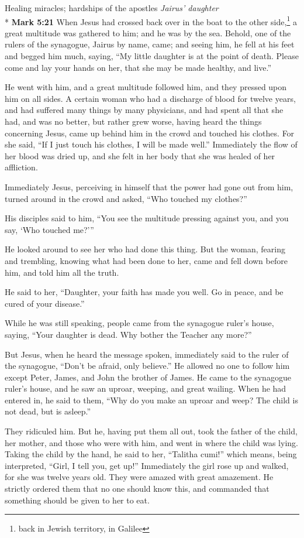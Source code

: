 \documentclass[10pt,a5paper,twoside]{article}
\newcommand{\quotesize}{\normalsize{}}
\newenvironment{quotetext}{\begingroup\quotesize}{\endgroup}
\newcommand{\intex}[1]{\index[texts]{#1}}
\newcommand{\bible}[2]{\begin{quotetext}\textbf{#1}\intex{#1} #2\end{quotetext}}
\newcommand{\gospelmark}[2]{\bible{Mark #1}{#2}}
\newcommand{\subhead}[1]{\emph{#1}\\*}
\begin{document}
\begin{section}{Healing miracles; hardships of the apostles}
\subhead{Jairus' daughter}
\gospelmark{5:21}{
  When Jesus had crossed back over in the boat to the other side,\footnote{back in Jewish territory, in Galilee} a great multitude was gathered to him; and he was by the sea.   Behold, one of the rulers of the synagogue, Jairus by name, came; and seeing him, he fell at his feet   and begged him much, saying, ``My little daughter is at the point of death. Please come and lay your hands on her, that she may be made healthy, and live.''

  He went with him, and a great multitude followed him, and they pressed upon him on all sides.   A certain woman who had a discharge of blood for twelve years,   and had suffered many things by many physicians, and had spent all that she had, and was no better, but rather grew worse,   having heard the things concerning Jesus, came up behind him in the crowd and touched his clothes.   For she said, ``If I just touch his clothes, I will be made well.''   Immediately the flow of her blood was dried up, and she felt in her body that she was healed of her affliction.

  Immediately Jesus, perceiving in himself that the power had gone out from him, turned around in the crowd and asked, ``Who touched my clothes?''

  His disciples said to him, ``You see the multitude pressing against you, and you say, `Who touched me?'{}''

  He looked around to see her who had done this thing.   But the woman, fearing and trembling, knowing what had been done to her, came and fell down before him, and told him all the truth.

  He said to her, ``Daughter, your faith has made you well. Go in peace, and be cured of your disease.''

  While he was still speaking, people came from the synagogue ruler's house, saying, ``Your daughter is dead. Why bother the Teacher any more?''

  But Jesus, when he heard the message spoken, immediately said to the ruler of the synagogue, ``Don't be afraid, only believe.''   He allowed no one to follow him except Peter, James, and John the brother of James.   He came to the synagogue ruler's house, and he saw an uproar, weeping, and great wailing.   When he had entered in, he said to them, ``Why do you make an uproar and weep? The child is not dead, but is asleep.''

  They ridiculed him. But he, having put them all out, took the father of the child, her mother, and those who were with him, and went in where the child was lying.   Taking the child by the hand, he said to her, ``Talitha cumi!'' which means, being interpreted, ``Girl, I tell you, get up!''   Immediately the girl rose up and walked, for she was twelve years old. They were amazed with great amazement.   He strictly ordered them that no one should know this, and commanded that something should be given to her to eat.}


\end{section}
\end{document}
